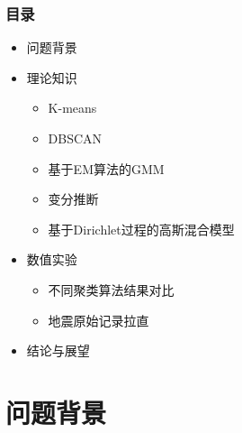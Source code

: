 \documentclass[10pt]{beamer}
\begin{document}
{
\maketitle

\begin{frame}
    \frametitle{目录}
    \bfseries
    \large
    \begin{itemize}
        \item 问题背景
        \vspace{5pt}\item 理论知识
        \begin{itemize}
            \vspace{5pt}\item K-means
            \item DBSCAN
            \item 基于EM算法的GMM
            \item 变分推断
            \item 基于Dirichlet过程的高斯混合模型
        \end{itemize}
        \vspace{5pt}\item 数值实验
        \begin{itemize}
            \vspace{5pt}\item 不同聚类算法结果对比
            \item 地震原始记录拉直
        \end{itemize}
        \vspace{5pt}\item 结论与展望
    \end{itemize}
\end{frame}

\section{问题背景}


}
\end{document}

